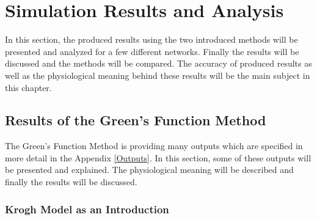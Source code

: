 \newpage
\section{Simulation Results and Analysis}
\label{Results}
In this section, the produced results using the two introduced methods will be presented and analyzed for a few different networks. Finally the results will be discussed and the methods will be compared. The accuracy of produced results as well as the physiological meaning behind these results will be the main subject in this chapter.

\subsection{Results of the Green's Function Method}
\label{ResultsGreens}

The Green's Function Method is providing many outputs which are specified in more detail in the Appendix \ref{Outputs}. In this section, some of these outputs will be presented and explained. The physiological meaning will be described and finally the results will be discussed.

\subsubsection*{Krogh Model as an Introduction}
\label{Krogh}

